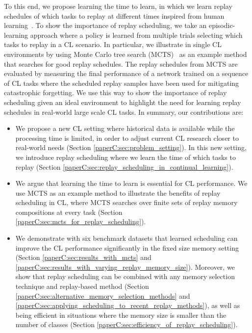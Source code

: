To this end, we propose learning the time to learn, in which we learn replay schedules of which tasks to replay at different times inspired from human learning~. 
To show the importance of replay scheduling, we take an episodic-learning approach where a policy is learned from multiple trials selecting which tasks to replay in a CL scenario. 
In particular, we illustrate in single CL environments by using Monte Carlo tree search (MCTS)~ as an example method that searches for good replay schedules. %
The replay schedules from MCTS are evaluated by measuring the final performance of a network trained on a sequence of CL tasks where the scheduled replay samples have been used for mitigating catastrophic forgetting. 
We use this way to show the importance of replay scheduling given an ideal environment to highlight the need for learning replay schedules in real-world large scale CL tasks. 
In summary, our contributions are:
\begin{itemize}[topsep=1pt,] %
	\setlength\itemsep{0.1mm}
	\item We propose a new CL setting where historical data is available while the processing time is limited, in order to adjust current CL research closer to real-world needs (Section \ref{paperC:sec:problem_setting}). In this new setting, we introduce replay scheduling where we learn the time of which tasks to replay (Section \ref{paperC:sec:replay_scheduling_in_continual_learning}).

	\item We argue that learning the time to learn is essential for CL performance. We use MCTS as an example method to illustrate the benefits of replay scheduling in CL, where MCTS searches over finite sets of replay memory compositions at every task (Section \ref{paperC:sec:mcts_for_replay_scheduling}). 

	\item We demonstrate with six benchmark datasets that learned scheduling can improve the CL performance significantly in the fixed size memory setting (Section \ref{paperC:sec:results_with_mcts} and \ref{paperC:sec:results_with_varying_replay_memory_size}). 
	Moreover, we show that replay scheduling %
	can be combined with any memory selection technique and replay-based method (Section \ref{paperC:sec:alternative_memory_selection_methods} and \ref{paperC:sec:applying_scheduling_to_recent_replay_methods}), as well as being efficient in situations where the 
	memory size is %
	smaller than the number of classes (Section \ref{paperC:sec:efficiency_of_replay_scheduling}). 
\end{itemize}





